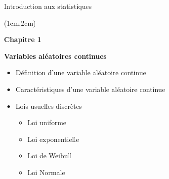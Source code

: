 \documentclass{beamer}
\begin{document}
    

\begin{frame}{Introduction aux statistiques}
\begin{textblock*}{\textwidth}(1cm,2cm)

\begin{center}{\bf \Large Chapitre 1} \end{center}
\begin{center}{\bf \Large Variables aléatoires continues} \end{center}
\vspace{0.3cm}
\begin{itemize}
\item Définition d'une variable aléatoire continue 
\item Caractéristiques d'une variable aléatoire continue
\item Lois usuelles discrètes 
\begin{itemize}
\item Loi uniforme
\item Loi exponentielle
\item Loi de Weibull
\item Loi Normale 
\end{itemize}
\end{itemize}

 \end{textblock*}

\end{frame}    
    
\end{document}
